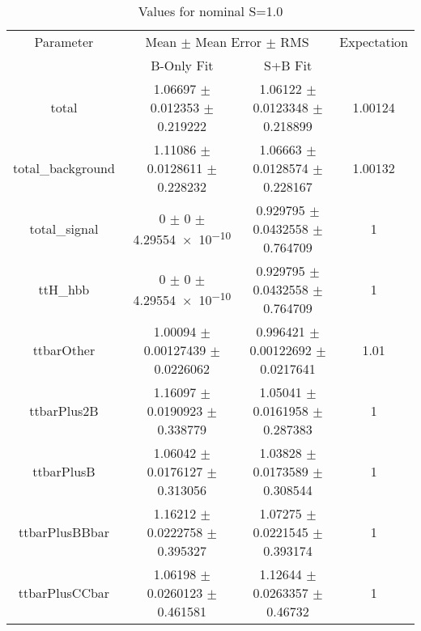 \begin{table}
\centering
\caption{Values for nominal S=1.0}
\begin{tabular}{cccc}
\toprule
Parameter & \multicolumn{2}{c}{Mean $\pm$ Mean Error $\pm$ RMS} & Expectation\\
 & B-Only Fit & S+B Fit & \\
\midrule
total & \num{1.06697} $\pm$ \num{0.012353} $\pm$ \num{0.219222} & \num{1.06122} $\pm$ \num{0.0123348} $\pm$ \num{0.218899} & \num{1.00124}\\
total\_background & \num{1.11086} $\pm$ \num{0.0128611} $\pm$ \num{0.228232} & \num{1.06663} $\pm$ \num{0.0128574} $\pm$ \num{0.228167} & \num{1.00132}\\
total\_signal & \num{0} $\pm$ \num{0} $\pm$ \num{4.29554e-10} & \num{0.929795} $\pm$ \num{0.0432558} $\pm$ \num{0.764709} & \num{1}\\
ttH\_hbb & \num{0} $\pm$ \num{0} $\pm$ \num{4.29554e-10} & \num{0.929795} $\pm$ \num{0.0432558} $\pm$ \num{0.764709} & \num{1}\\
ttbarOther & \num{1.00094} $\pm$ \num{0.00127439} $\pm$ \num{0.0226062} & \num{0.996421} $\pm$ \num{0.00122692} $\pm$ \num{0.0217641} & \num{1.01}\\
ttbarPlus2B & \num{1.16097} $\pm$ \num{0.0190923} $\pm$ \num{0.338779} & \num{1.05041} $\pm$ \num{0.0161958} $\pm$ \num{0.287383} & \num{1}\\
ttbarPlusB & \num{1.06042} $\pm$ \num{0.0176127} $\pm$ \num{0.313056} & \num{1.03828} $\pm$ \num{0.0173589} $\pm$ \num{0.308544} & \num{1}\\
ttbarPlusBBbar & \num{1.16212} $\pm$ \num{0.0222758} $\pm$ \num{0.395327} & \num{1.07275} $\pm$ \num{0.0221545} $\pm$ \num{0.393174} & \num{1}\\
ttbarPlusCCbar & \num{1.06198} $\pm$ \num{0.0260123} $\pm$ \num{0.461581} & \num{1.12644} $\pm$ \num{0.0263357} $\pm$ \num{0.46732} & \num{1}\\
\bottomrule
\end{tabular}
\end{table}